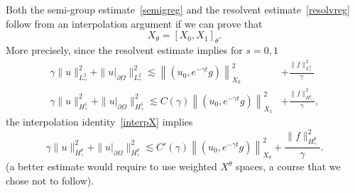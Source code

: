 \documentclass[10pt]{amsart}
\theoremstyle{definition}\newtheorem{defi}[theo]{Definition}\newtheorem{rema}[theo]{Remark}\newtheorem{exam}[theo]{Example}\newtheorem{exem}[theo]{Example}\newtheorem{nota}[theo]{Notation}
\begin{document}
Both the semi-group estimate~\eqref{semigreg} and the resolvent estimate~\eqref{resolvreg} follow from an interpolation argument if we can prove that
\begin{equation}\label{interpX}
X_\theta=[X_0,X_1]_\theta.
\end{equation}
More precisely, since the resolvent estimate implies for $s=0,1$
\begin{align*}
\gamma\|u\|_{L^2_\gamma}^2+\|u|_{\partial\Omega}\|^2_{L^2_\gamma}\lesssim \left\|\left(u_0,e^{-\gamma t}g\right)\right\|_{X_0}^2 &+\frac{\|f\|_{L^2_\gamma}^2}{\gamma}\\
\gamma\|u\|_{H^1_\gamma}^2+\|u|_{\partial\Omega}\|^2_{H^1_\gamma}\lesssim C(\gamma)\left\|\left(u_0,e^{-\gamma t}g\right)\right\|_{X_1}^2 &+\frac{\|f\|_{H^1_\gamma}^2}{\gamma},
\end{align*}
the interpolation identity~\eqref{interpX} implies
\begin{equation}\label{resolvsupersharp}
\gamma\|u\|_{H^\theta_\gamma}^2+\|u|_{\partial\Omega}\|^2_{H^\theta_\gamma}\lesssim C'(\gamma)\left\|\left(u_0,e^{-\gamma t}g\right)\right\|_{X_\theta}^2 +\frac{\|f\|_{H^\theta_\gamma}^2}{\gamma}.
\end{equation}
(a better estimate would require to use weighted $X^\theta$ spaces, a course that we chose not to follow).
\end{document}
